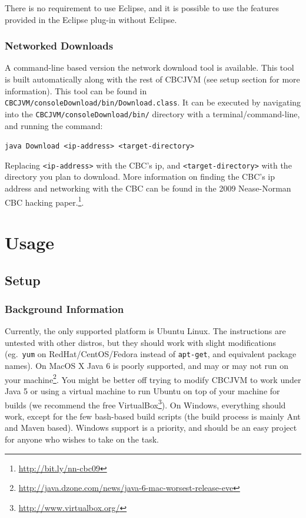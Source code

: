 \documentclass[10pt,letterpaper]{article}
\newcommand{\urlfootnote}[1]{\footnote{\url{#1}}}
\newcommand{\code}[1]{\par\texttt{#1}\par}
\begin{document}
There is no requirement to use Eclipse, and it is possible to use the features provided in the Eclipse plug-in without Eclipse.



\subsubsection{Networked Downloads}

A command-line based version the network download tool is available. This tool is built automatically along with the rest of CBCJVM (see setup section for more information). This tool can be found in \texttt{CBCJVM/\-consoleDownload/\-bin/\-Download.\-class}. It can be executed by navigating into the \texttt{CBCJVM/\-consoleDownload/\-bin/} directory with a terminal/command-line, and running the command: \code{java Download <ip-address> <target-directory>} Replacing \texttt{<ip-address>} with the CBC's ip, and \texttt{<target-directory>} with the directory you plan to download. More information on finding the CBC's ip address and networking with the CBC can be found in the 2009 Nease-Norman CBC hacking paper.\urlfootnote{http://bit.ly/nn-cbc09}.



\pagebreak
\section{Usage}

\subsection{Setup}

\subsubsection{Background Information}

Currently, the only supported platform is Ubuntu Linux. The instructions are untested with other distros, but they should work with slight modifications (eg.\ \texttt{yum} on RedHat/CentOS/Fedora instead of \texttt{apt-get}, and equivalent package names). On MacOS X Java 6 is poorly supported, and may or may not run on your machine\urlfootnote{http://java.dzone.com/news/java-6-mac-worsest-release-eve}. You might be better off trying to modify CBCJVM to work under Java 5 or using a virtual machine to run Ubuntu on top of your machine for builds (we recommend the free VirtualBox\urlfootnote{http://www.virtualbox.org/}). On Windows, everything should work, except for the few bash-based build scripts (the build process is mainly Ant and Maven based). Windows support is a priority, and should be an easy project for anyone who wishes to take on the task.
\end{document}
